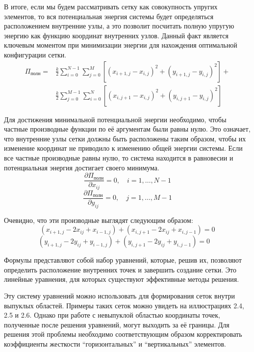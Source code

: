 \documentclass[a4paper,14pt,russian]{extreport}
\renewcommand{\_}{\kern-1.5pt\textunderscore\kern-1.5pt}
\begin{document}
В итоге, если мы будем рассматривать сетку как совокупность упругих элементов, то вся потенциальная энергия системы будет определяться расположением внутренние узлы, а это позволит посчитать полную упругую энергию как функцию координат внутренних узлов. Данный факт является ключевым моментом при минимизации энергии для нахождения оптимальной конфигурации сетки.
\begin{align*}
\Pi_{\text{полн}} = & \frac{k}{2} \sum_{i=0}^{N-1} \sum_{j=0}^M \left[(x_{i+1,j} - x_{i,j})^2 + (y_{i+1,j} - y_{i,j})^2\right] + \\
& \frac{k}{2} \sum_{j=0}^{M-1} \sum_{i=0}^N \left[(x_{i,j+1} - x_{i,j})^2 + (y_{i,j+1} - y_{i,j})^2\right]
\end{align*}

Для достижения минимальной потенциальной энергии необходимо, чтобы частные производные функции по её аргументам были равны нулю. Это означает, что внутренние узлы сетки должны быть расположены таким образом, чтобы их изменение координат не приводило к изменению общей энергии системы. Если все частные производные равны нулю, то система находится в равновесии и потенциальная энергия достигает своего минимума.
\begin{equation}
    \frac{\partial \Pi_{\text{полн}}}{\partial x_{ij}} = 0, \quad i=1, \ldots, N-1
\end{equation}
\begin{equation}
    \frac{\partial \Pi_{\text{полн}}}{\partial y_{ij}} = 0, \quad j=1, \ldots, M-1
\end{equation}

Очевидно, что эти производные выглядят следующим образом:
\begin{equation}
    (x_{i+1,j} - 2x_{ij} + x_{i-1,j}) + (x_{i,j+1} - 2x_{ij} + x_{i,j-1}) = 0
\end{equation}
\begin{equation}
    (y_{i+1,j} - 2y_{ij} + y_{i-1,j}) + (y_{i,j+1} - 2y_{ij} + y_{i,j-1}) = 0 \quad
\end{equation}

Формулы представляют собой набор уравнений, которые, решив их, позволяют определить расположение внутренних точек и завершить создание сетки. Это линейные уравнения, для которых существуют эффективные методы решения.

Эту систему уравнений можно использовать для формирования сеток внутри выпуклых областей. Примеры таких сеток можно увидеть на иллюстрациях 2.4, 2.5 и 2.6. Однако при работе с невыпуклой областью координаты точек, полученные после решения уравнений, могут выходить за её границы. Для решения этой проблемы необходимо соответствующим образом корректировать коэффициенты жесткости “горизонтальных” и “вертикальных” элементов.
\end{document}
